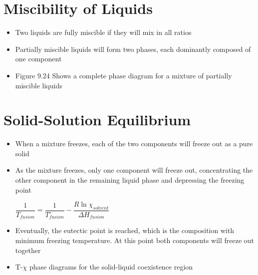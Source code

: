 \documentclass[12pt, openany, letterpaper]{memoir}
\begin{document}
\section*{Miscibility of Liquids}
\begin{itemize}
	\item Two liquids are fully miscible if they will mix in all ratios
	\item Partially miscible liquids will form two phases, each dominantly composed of one component
	\item Figure 9.24 Shows a complete phase diagram for a mixture of partially miscible liquids 
\end{itemize}

\section*{Solid-Solution Equilibrium}
\begin{itemize}
	\item When a mixture freezes, each of the two components will freeze out as a pure solid
	\item As the mixture freezes, only one component will freeze out, concentrating the other component in the remaining liquid phase and depressing the freezing point
	
	$\dfrac{1}{T_{fusion}} = \dfrac{1}{T^\circ_{fusion}}-\dfrac{R\ln\chi_{solvent}}{\Delta H_{fusion}}$
	\item Eventually, the eutectic point is reached, which is the composition with minimum freezing temperature. At this point both components will freeze out together
	\item T-$\chi$ phase diagrams for the solid-liquid coexistence region 
\end{itemize}
\end{document}
